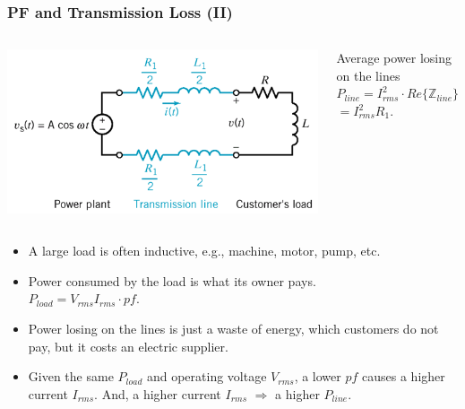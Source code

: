 \documentclass{beamer}
\begin{document}
\begin{frame}[fragile]
\frametitle{PF and Transmission Loss (II)}

\begin{columns}[c]
\includegraphics[width=\textwidth]{src/TransmissionLinesCCT.png}

Average power losing on the lines
\\ $P_{line} = I_{rms}^2 \cdot Re\{ \mathbb{Z}_{line} \}$
$=I_{rms}^2 R_1$.
\end{columns}

\begin{itemize}
\item A large load is often inductive, e.g., machine, motor, pump, etc.
\item Power consumed by the load is what its owner pays.
\\
$P_{load} = V_{rms} I_{rms} \cdot pf$.
\item Power losing on the lines is just a waste of energy, which customers do not pay, but it costs an electric supplier.
\item Given the same $P_{load}$ and operating voltage $V_{rms}$,
a lower $pf$ causes a higher current $I_{rms}$.
And, a higher current $I_{rms}$ $\Rightarrow$ a higher $P_{line}$.
\end{itemize}


\end{frame}

\end{document}

